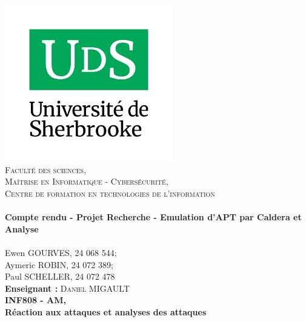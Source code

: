 \begin{titlepage}
\begin{center}
    \includegraphics[width=0.55\textwidth]{images/UdeS_logo_v_rgbHR.png}~\\[0cm]
    \textsc{\large Faculté des sciences, \\Maîtrise en Informatique - Cybersécurité, \\Centre de formation en technologies de l’information
}\\[1.0cm]
    \HRule \\[0.3cm]
    { \LARGE 
      \textbf{Compte rendu - Projet Recherche - Emulation d'APT par Caldera et Analyse}\\[0.3cm]
    }
    \HRule \\[1.0cm]
    { \large
    Ewen GOURVES, 24 068 544;\\[0.2cm]
    Aymeric ROBIN, 24 072 389;\\[0.2cm]
    Paul SCHELLER, 24 072 478\\[0.7cm]
    \textbf{Enseignant :}
    \textsc{Daniel MIGAULT}
    }
    \vfill
    \textbf{\large \\INF808 - AM, \\Réaction aux attaques et analyses des attaques}
    {\large }

\end{center}
\end{titlepage}